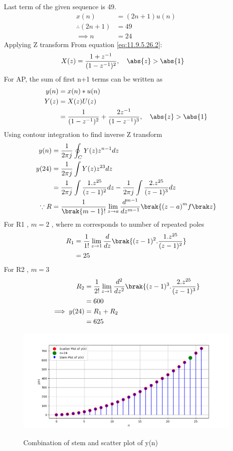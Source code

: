 \documentclass[journal,12pt,twocolumn]{IEEEtran}
\theoremstyle{remark}
\begin{document}
Last term of the given sequence is 49.
\begin{align}
 x(n) &= (2n+1)u(n) \\
 \therefore ( 2n +1 ) &= 49 \\
\implies n &= 24 
\end{align}
Applying Z transform
From equation \eqref{eq:11.9.5.26.2}:
\begin{align}
   X(z) &= \frac{1+z^{-1}}{(1-z^{-1})^2},  \quad \abs{z} > \abs{1}  
\end{align}
For AP, the sum of first n+1 terms can be written as 
\begin{align}
y(n)&=x(n)*u(n) \\
Y(z) &= X(z)U(z)\\
 &=\frac{1}{(1-z^{-1})^2} + \frac{2z^{-1}}{(1-z^{-1})^3}, \quad \abs{z} > \abs{1} 
\end{align}
Using contour integration to find inverse Z transform
\begin{align}
y(n) &= \frac{1}{2\pi j} \oint_C Y(z) z^{n-1} dz\\
y(24) &= \frac{1}{2\pi j}\int Y(z) z^{23} dz \\
 &= \frac{1}{2\pi j}\int \frac{1.z^{25}}{(z-1)^{2}} dz - \frac{1}{2\pi j}\int \frac{2.z^{25}}{(z-1)^{3}} dz\\
 \because R&=\frac{1}{\brak {m-1}!}\lim\limits_{z\to a}\frac{d^{m-1}}{dz^{m-1}}\brak {{(z-a)}^{m}f\brak z}
 \end{align}
 For R1 , $m = 2$ , where m corresponds to number of repeated poles \\
 \begin{align}
 R_1 &=\frac{1}{1!}\lim\limits_{z\to 1}\frac{d}{dz}\brak {(z-1)^2.\frac{1.z^{25}}{(z-1)^{2}}}\\
 &= 25
 \end{align}
 For R2 , $m = 3$ \\
 \begin{align}
 R_2 &=\frac{1}{2!}\lim\limits_{z\to 1}\frac{d^2}{dz^2}\brak {(z-1)^3.\frac{2.z^{25}}{(z-1)^{3}}}\\
 &= 600\\
 \implies y(24) &= R_1 + R_2 \\
&= 625
\end{align}

\begin{figure}[h!]
\centering
\includegraphics[width=\columnwidth]{ncert-maths/10/5/3/14/figs/stem_plot.png}
\label{fig:tans_plott}
\caption{Combination of stem and scatter plot of y(n)}
\end{figure}

 
\end{document}
